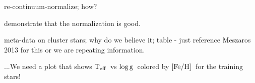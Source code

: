 \documentclass[12pt, preprint]{aastex}
\newcommand{\teff}{\mbox{$\rm T_{eff}$}}
\newcommand{\feh}{\mbox{$\rm [Fe/H]$}}
\newcommand{\logg}{\mbox{$\rm \log g$}}
\begin{document}
re-continuum-normalize; how?

demonstrate that the normalization is good.

meta-data on cluster stars; why do we believe it; table - just reference Meszaros 2013 for this or we are repeating information. 

...We need a plot that shows \teff\ vs \logg\ colored by \feh\ for the training stars!

%
%
\end{document}
